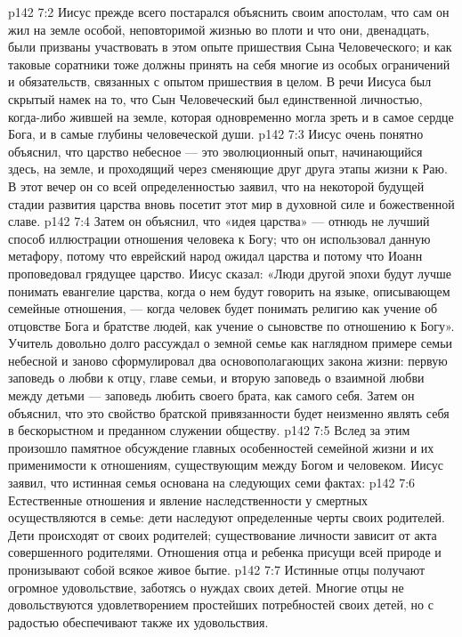 \vs p142 7:2 Иисус прежде всего постарался объяснить своим апостолам, что сам он жил на земле особой, неповторимой жизнью во плоти и что они, двенадцать, были призваны участвовать в этом опыте пришествия Сына Человеческого; и как таковые соратники тоже должны принять на себя многие из особых ограничений и обязательств, связанных с опытом пришествия в целом. В речи Иисуса был скрытый намек на то, что Сын Человеческий был единственной личностью, когда\hyp{}либо жившей на земле, которая одновременно могла зреть и в самое сердце Бога, и в самые глубины человеческой души.
\vs p142 7:3 Иисус очень понятно объяснил, что царство небесное --- это эволюционный опыт, начинающийся здесь, на земле, и проходящий через сменяющие друг друга этапы жизни к Раю. В этот вечер он со всей определенностью заявил, что на некоторой будущей стадии развития царства вновь посетит этот мир в духовной силе и божественной славе.
\vs p142 7:4 Затем он объяснил, что «идея царства» --- отнюдь не лучший способ иллюстрации отношения человека к Богу; что он использовал данную метафору, потому что еврейский народ ожидал царства и потому что Иоанн проповедовал грядущее царство. Иисус сказал: «Люди другой эпохи будут лучше понимать евангелие царства, когда о нем будут говорить на языке, описывающем семейные отношения, --- когда человек будет понимать религию как учение об отцовстве Бога и братстве людей, как учение о сыновстве по отношению к Богу». Учитель довольно долго рассуждал о земной семье как наглядном примере семьи небесной и заново сформулировал два основополагающих закона жизни: первую заповедь о любви к отцу, главе семьи, и вторую заповедь о взаимной любви между детьми --- заповедь любить своего брата, как самого себя. Затем он объяснил, что это свойство братской привязанности будет неизменно являть себя в бескорыстном и преданном служении обществу.
\vs p142 7:5 Вслед за этим произошло памятное обсуждение главных особенностей семейной жизни и их применимости к отношениям, существующим между Богом и человеком. Иисус заявил, что истинная семья основана на следующих семи фактах:
\vs p142 7:6 \bibnobreakspace {} Естественные отношения и явление наследственности у смертных осуществляются в семье: дети наследуют определенные черты своих родителей. Дети происходят от своих родителей; существование личности зависит от акта совершенного родителями. Отношения отца и ребенка присущи всей природе и пронизывают собой всякое живое бытие.
\vs p142 7:7 \pc {}\bibnobreakspace {} Истинные отцы получают огромное удовольствие, заботясь о нуждах своих детей. Многие отцы не довольствуются удовлетворением простейших потребностей своих детей, но с радостью обеспечивают также их удовольствия.
